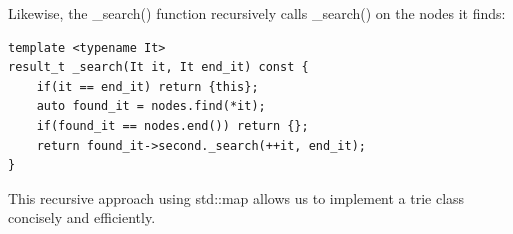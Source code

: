Likewise, the \_search() function recursively calls \_search() on the nodes it finds:

\begin{lstlisting}[style=styleCXX]
template <typename It>
result_t _search(It it, It end_it) const {
	if(it == end_it) return {this};
	auto found_it = nodes.find(*it);
	if(found_it == nodes.end()) return {};
	return found_it->second._search(++it, end_it);
}
\end{lstlisting}

This recursive approach using std::map allows us to implement a trie class concisely and efficiently.






























